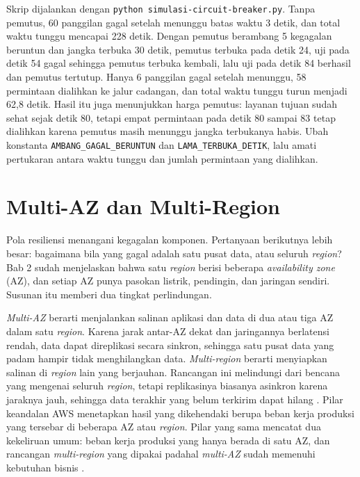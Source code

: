 \begin{pendalaman}[title={Pendalaman Teknis (opsional): Mensimulasikan Circuit Breaker}]
  Skrip dijalankan dengan \texttt{python simulasi-circuit-breaker.py}. Tanpa pemutus, 60 panggilan
  gagal setelah menunggu batas waktu 3 detik, dan total waktu tunggu mencapai 228 detik. Dengan
  pemutus berambang 5 kegagalan beruntun dan jangka terbuka 30 detik, pemutus terbuka pada detik
  24, uji pada detik 54 gagal sehingga pemutus terbuka kembali, lalu uji pada detik 84 berhasil dan
  pemutus tertutup. Hanya 6 panggilan gagal setelah menunggu, 58 permintaan dialihkan ke jalur
  cadangan, dan total waktu tunggu turun menjadi 62,8 detik. Hasil itu juga menunjukkan harga
  pemutus: layanan tujuan sudah sehat sejak detik 80, tetapi empat permintaan pada detik 80 sampai
  83 tetap dialihkan karena pemutus masih menunggu jangka terbukanya habis. Ubah konstanta
  \texttt{AMBANG\_GAGAL\_BERUNTUN} dan \texttt{LAMA\_TERBUKA\_DETIK}, lalu amati pertukaran antara
  waktu tunggu dan jumlah permintaan yang dialihkan.
\end{pendalaman}

\section{Multi-AZ dan Multi-Region}
\label{sec:ch12-multi-az}

Pola resiliensi menangani kegagalan komponen. Pertanyaan berikutnya lebih besar: bagaimana bila yang
gagal adalah satu pusat data, atau seluruh \textit{region}? Bab 2 sudah menjelaskan bahwa satu
\textit{region} berisi beberapa \textit{availability zone} (AZ), dan setiap AZ punya pasokan
listrik, pendingin, dan jaringan sendiri. Susunan itu memberi dua tingkat perlindungan.

\textit{Multi-AZ} berarti menjalankan salinan aplikasi dan data di dua atau tiga AZ dalam satu
\textit{region}. Karena jarak antar-AZ dekat dan jaringannya berlatensi rendah, data dapat
direplikasi secara sinkron, sehingga satu pusat data yang padam hampir tidak menghilangkan data.
\textit{Multi-region} berarti menyiapkan salinan di \textit{region} lain yang berjauhan. Rancangan
ini melindungi dari bencana yang mengenai seluruh \textit{region}, tetapi replikasinya biasanya
asinkron karena jaraknya jauh, sehingga data terakhir yang belum terkirim dapat hilang
\cite{c12-aws-dr2021}. Pilar keandalan AWS menetapkan hasil yang dikehendaki berupa beban kerja
produksi yang tersebar di beberapa AZ atau \textit{region}. Pilar yang sama mencatat dua kekeliruan
umum: beban kerja produksi yang hanya berada di satu AZ, dan rancangan \textit{multi-region} yang
dipakai padahal \textit{multi-AZ} sudah memenuhi kebutuhan bisnis \cite{c12-aws-rel10}.

